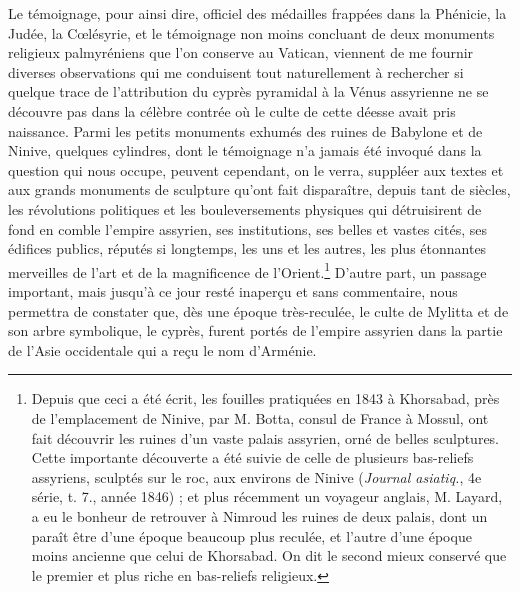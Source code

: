 \documentclass[a4paper, 11pt, oneside, polutonikogreek, french]{article}
\begin{document}
Le témoignage, pour ainsi dire, officiel des médailles frappées dans la Phénicie, la Judée, la Cœlésyrie, et le témoignage non moins concluant de deux monuments religieux palmyréniens que l'on conserve au Vatican, viennent de me fournir diverses observations qui me conduisent tout naturellement à rechercher si quelque trace de l'attribution du cyprès pyramidal à la Vénus assyrienne ne se découvre pas dans la célèbre contrée où le culte de cette déesse avait pris naissance. Parmi les petits monuments exhumés des ruines de Babylone et de Ninive, quelques cylindres, dont le témoignage n'a jamais été invoqué dans la question qui nous occupe, peuvent cependant, on le verra, suppléer aux textes et aux grands monuments de sculpture qu'ont fait disparaître, depuis tant de siècles, les révolutions politiques et les bouleversements physiques qui détruisirent de fond en comble l'empire assyrien, ses institutions, ses belles et vastes cités, ses édifices publics, réputés si longtemps, les uns et les autres, les plus étonnantes merveilles de l'art et de la magnificence de l'Orient.\footnote{Depuis que ceci a été écrit, les fouilles pratiquées en 1843 à Khorsabad, près de l'emplacement de Ninive, par M. Botta, consul de France à Mossul, ont fait découvrir les ruines d'un vaste palais assyrien, orné de belles sculptures. Cette importante découverte a été suivie de celle de plusieurs bas-reliefs assyriens, sculptés sur le roc, aux environs de Ninive (\emph{Journal asiatiq.}, 4e série, t. 7., année 1846) ; et plus récemment un voyageur anglais, M. Layard, a eu le bonheur de retrouver à Nimroud les ruines de deux palais, dont un paraît être d'une époque beaucoup plus reculée, et l'autre d'une époque moins ancienne que celui de Khorsabad. On dit le second mieux conservé que le premier et plus riche en bas-reliefs religieux.} D'autre part, un passage important, mais jusqu'à ce jour resté inaperçu et sans commentaire, nous permettra de constater que, dès une époque très-reculée, le culte de Mylitta et de son arbre symbolique, le cyprès, furent portés de l'empire assyrien dans la partie de l'Asie occidentale qui a reçu le nom d'Arménie.
\end{document}
